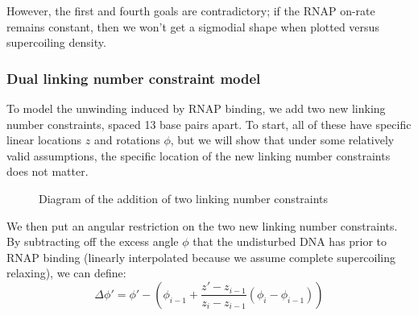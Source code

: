 \documentclass[11pt]{article}
\begin{document}
However, the first and fourth goals are contradictory; if the RNAP on-rate remains constant, then we won't get a sigmodial shape when plotted versus supercoiling density.

\FloatBarrier
\subsubsection{Dual linking number constraint model}
To model the unwinding induced by RNAP binding, we add two new linking number constraints, spaced 13 base pairs apart. To start, all of these have specific linear locations \(z\) and rotations \(\phi\), but we will show that under some relatively valid assumptions, the specific location of the new linking number constraints does not matter.

\begin{figure}[h]
    \centering
    \caption{Diagram of the addition of two linking number constraints}
    \label{fig:lnc_diagram}
\end{figure}

We then put an angular restriction on the two new linking number constraints. By subtracting off the excess angle \(\phi\) that the undisturbed DNA has prior to RNAP binding (linearly interpolated because we assume complete supercoiling relaxing), we can define:
\begin{equation}
    \Delta \phi' = \phi' - \left(\phi_{i - 1} + \frac{z' - z_{i-1}}{z_i - z_{i-1}} (\phi_i - \phi_{i-1})\right)
\end{equation}
\end{document}
